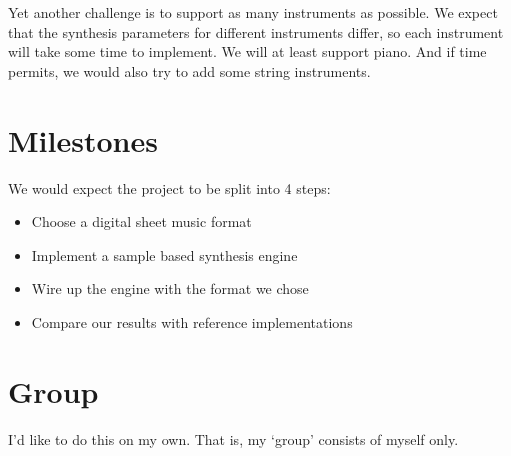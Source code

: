 \documentclass{article}
\begin{document}
Yet another challenge is to support as many instruments as
possible. We expect that the synthesis parameters for different instruments
differ, so each instrument will take some time to implement. We will at
least support piano. And if time permits, we would also try to add
some string instruments.

\section{Milestones}

We would expect the project to be split into 4 steps:
\begin{itemize}
  \item Choose a digital sheet music format
  \item Implement a sample based synthesis engine
  \item Wire up the engine with the format we chose
  \item Compare our results with reference implementations
\end{itemize}

\section{Group}

I'd like to do this on my own. That is, my `group' consists of myself only.
\end{document}
